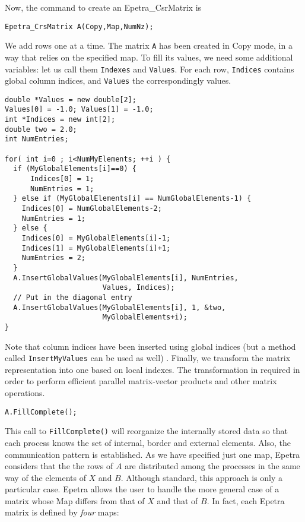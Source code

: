 Now, the command to create an Epetra\_CsrMatrix is
\begin{verbatim}
Epetra_CrsMatrix A(Copy,Map,NumNz);
\end{verbatim}
We add rows one at a time. The matrix \verb!A! has been created in Copy
mode, in a way that relies on the specified map. To fill its values, we
need some additional variables: let us call them \verb!Indexes! and
\verb!Values!. For each row, \verb!Indices! contains global column
indices, and \verb!Values! the correspondingly values.
\begin{verbatim}
double *Values = new double[2];
Values[0] = -1.0; Values[1] = -1.0;
int *Indices = new int[2];
double two = 2.0;
int NumEntries;

for( int i=0 ; i<NumMyElements; ++i ) {
  if (MyGlobalElements[i]==0) {
      Indices[0] = 1;
      NumEntries = 1;
  } else if (MyGlobalElements[i] == NumGlobalElements-1) {
    Indices[0] = NumGlobalElements-2;
    NumEntries = 1;
  } else {
    Indices[0] = MyGlobalElements[i]-1;
    Indices[1] = MyGlobalElements[i]+1;
    NumEntries = 2;
  }
  A.InsertGlobalValues(MyGlobalElements[i], NumEntries, 
                       Values, Indices);
  // Put in the diagonal entry
  A.InsertGlobalValues(MyGlobalElements[i], 1, &two, 
                       MyGlobalElements+i);
}
\end{verbatim}
Note that column indices have been inserted using global indices (but a
method called \verb!InsertMyValues! can be used as well) .  Finally, we
transform the matrix representation into one based on local indexes. The
transformation in required in order to perform efficient parallel
matrix-vector products and other matrix operations.
\begin{verbatim}
A.FillComplete();
\end{verbatim}
This call to \verb!FillComplete()! will reorganize the internally stored
data so that each process knows the set of internal, border and external
elements. Also, the communication pattern is established. As we have
specified just one map, Epetra considers that the the rows of $A$ are
distributed among the processes in the same way of the elements of $X$
and $B$.  Although standard, this approach is only a particular case.
Epetra allows the user to handle the more general case of a matrix whose
Map differs from that of $X$ and that of $B$. In fact, each Epetra
matrix is defined by {\sl four} maps:
